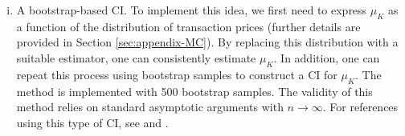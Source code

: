 \begin{enumerate}[(i)]
    \item A bootstrap-based CI. To implement this idea, we first need to express $\mu_K$ as a function of the distribution of transaction prices (further details are provided in Section \ref{sec:appendix-MC}). By replacing this distribution with a suitable estimator, one can consistently estimate $\mu_K$. In addition, one can repeat this process using bootstrap samples to construct a CI for $\mu _{K}$. The method is implemented with 500 bootstrap samples. The validity of this method relies on standard asymptotic arguments with $n\to\infty$. For references using this type of CI, see \cite{BajariHortacsu2003} and \cite{hailetamer2003}.
\end{enumerate}

